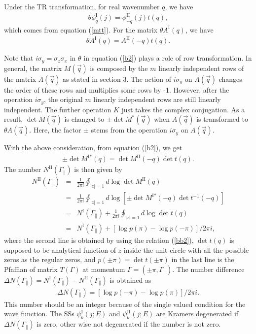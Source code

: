 \documentclass[aps,pra,amsmath,twocolumn,showpacs,bibnotes,10pt]{revtex4-1}
\begin{document}
Under the TR transformation, for real wavenumber $q$, we have
\begin{eqnarray}
\theta \phi^{\text{I}}_{q}(j) = \phi^{\text{II}}_{-q}(j)t(q),  \label{b1}
\end{eqnarray}
which comes from equation (\ref{mtt}). For the matrix $\theta A^{\text{I}}(q)$, we have 
\begin{eqnarray}
\theta A^{\text{I}}(q) = A^{\text{II}}(-q)t(q). \label{b2}
\end{eqnarray}

Note that $i\sigma_y = \sigma_z\sigma_x$ in $\theta$ in equation (\ref{b2}) plays a role of row transformation. In general, the matrix $M(\vec q)$ is composed by the $m$ linearly independent rows of the matrix $A(\vec q)$ as stated in section 3. The action of $i\sigma_y$ on $A(\vec q)$ changes the order of these rows and multiplies some rows by -1. However, after the operation $i\sigma_y$, the original $m$ linearly independent rows are still linearly independent. The further operation $K$ just takes the complex conjugation. As a result, $\det M(\vec q)$ is changed to $\pm\det M^{\ast}(\vec q)$ when $A(\vec q)$ is transformed to $\theta A(\vec q)$. Here, the factor $\pm$ stems from the operation $i\sigma_y$ on $A(\vec q)$.

With the above consideration, from equation (\ref{b2}), we get
\begin{eqnarray}
\pm\det M^{\text{I}\ast}(q) = \det M^{\text{II}}(-q) \det t(q). \label{bb2}
\end{eqnarray}
The number $N^{\text{II}}(\Gamma_{\parallel})$ is then given by
\begin{eqnarray}
N^{\text{II}}(\Gamma_{\parallel}) &=& \frac{1}{2\pi i}\oint_{|z|=1}d\log \det M^{\text{II}}(q) \nonumber\\
&=& \frac{1}{2\pi i}\oint_{|z|=1}d\log [\pm\det M^{\text{I}\ast}(-q)\det t^{-1}(-q)]  \nonumber\\  
&=& N^{\text{I}}(\Gamma_{\parallel})+\frac{1}{2\pi i}\oint_{|z|=1}d\log\det t(q) \nonumber\\  
&=& N^{\text{I}}(\Gamma_{\parallel})+[\log p(\pi)-\log p(-\pi)]/2\pi i,  \label{ns2}
\end{eqnarray}
where the second line is obtained by using the relation (\ref{bb2}), $\det t(q)$ is supposed to be analytical function of $z$ inside the unit circle with all the possible zeros as the regular zeros, and $p(\pm\pi) = \det t(\pm\pi)$ in the last line is the Pfaffian of matrix $T(\Gamma)$ at momentum $\Gamma = (\pm\pi,\Gamma_{\parallel})$.
The number difference $\Delta N(\Gamma_{\parallel})= N^{\text{I}}(\Gamma_{\parallel})-N^{\text{II}}(\Gamma_{\parallel})$ is obtained as
\begin{eqnarray}
\Delta N(\Gamma_{\parallel}) = [\log p(-\pi)-\log p(\pi)]/2\pi i.  \label{nsfr}
\end{eqnarray}
This number should be an integer because of the single valued condition for the wave function. The SSs $\psi^{\text{I}}_b(j;E)$ and $\psi^{\text{II}}_b(j;E)$ are Kramers degenerated if $\Delta N(\Gamma_{\parallel})$ is zero, other wise not degenerated if the number is not zero.
\end{document}
